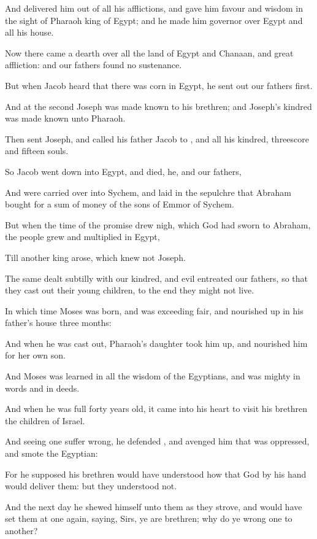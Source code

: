 {And
delivered
him out
of
all
his
afflictions,
and
gave
him
favour
and
wisdom in the sight
of
Pharaoh
king of
Egypt;
and he
made
him
governor
over
Egypt
and
all
his
house.

Now there
came a
dearth
over
all the
land of
Egypt
and
Chanaan,
and
great
affliction:
and
our
fathers
found
no
sustenance.

But
when
Jacob
heard that there
was
corn
in
Egypt, he sent
out
our
fathers
first.

And
at the
second
{}
Joseph was made
known
to
his
brethren;
and
Joseph’s
kindred was
made
known unto
Pharaoh.

Then
sent
Joseph,
and
called
his
father
Jacob
to
{},
and
all
his
kindred,
threescore and
fifteen
souls.

So
Jacob went
down
into
Egypt,
and
died,
he,
and
our
fathers,

And were carried
over
into
Sychem,
and
laid
in the
sepulchre
that
Abraham
bought for a
sum of
money of the
sons
of
Emmor
{}
of
Sychem.

But
when the
time of the
promise drew
nigh,
which
God had
sworn to
Abraham, the
people
grew
and
multiplied
in
Egypt,

Till
another
king
arose,
which
knew
not
Joseph.

The
same dealt
subtilly
with
our
kindred, and evil
entreated
our
fathers, so that
they cast
out
their young
children, to the
end they
might
not
live.

In
which
time
Moses was
born,
and
was
exceeding
fair,
and
nourished up
in
his
father’s
house
three
months:

And
when
he was cast
out,
Pharaoh’s
daughter
took
him up, and
nourished
him
for her
own
son.

And
Moses was
learned in
all the
wisdom of the
Egyptians,
and
was
mighty
in
words
and
in
deeds.

And
when
he was
full forty
years
old, it
came
into
his
heart to
visit
his
brethren the
children of
Israel.

And
seeing
one
{} suffer
wrong, he
defended
{},
and
avenged him that was
oppressed,
and
smote the
Egyptian:

For he
supposed
his
brethren would have
understood how
that
God
by
his
hand would
deliver
them:
but they
understood
not.

And the
next
day he shewed
himself unto
them as they
strove,
and would have
set
them
at
one
again,
saying,
Sirs,
ye
are
brethren;
why do ye
wrong one to
another?

}
